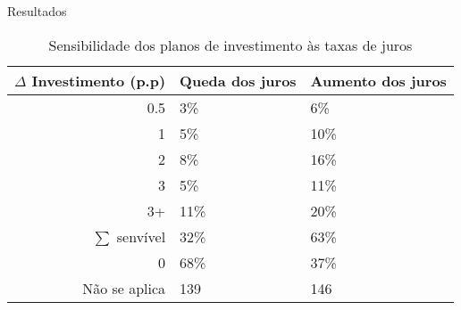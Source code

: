 \documentclass[presentation]{beamer}
\begin{document}
\begin{frame}[label={sec:orgc12be3e}]{Resultados}
\begin{table}[htbp]
\caption{Sensibilidade dos planos de investimento às taxas de juros}
\centering
\begin{tabular}{rll}
\hline
\(\Delta\) Investimento (p.p) & Queda dos juros & Aumento dos juros\\
\hline
0.5 & 3\% & 6\%\\
1 & 5\% & 10\%\\
2 & 8\% & 16\%\\
3 & 5\% & 11\%\\
3+ & 11\% & 20\%\\
\hline
\(\sum\) senvível & 32\% & 63\%\\
\hline
0 & 68\% & 37\%\\
Não se aplica & 139 & 146\\
\hline
\end{tabular}
\end{table}
\end{frame}
\end{document}
